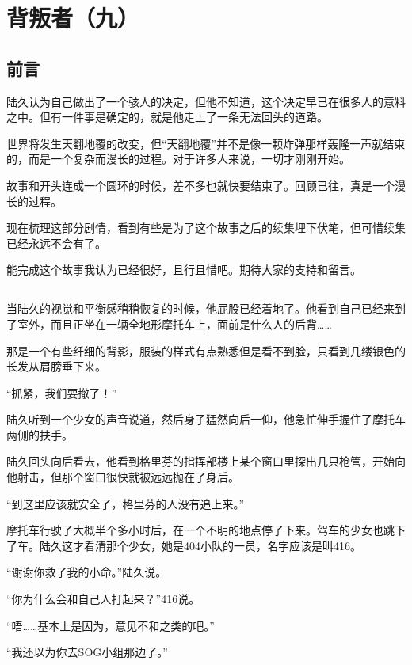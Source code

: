 \chapter{背叛者（九）}

\section*{前言}


陆久认为自己做出了一个骇人的决定，但他不知道，这个决定早已在很多人的意料之中。但有一件事是确定的，就是他走上了一条无法回头的道路。

世界将发生天翻地覆的改变，但“天翻地覆”并不是像一颗炸弹那样轰隆一声就结束的，而是一个复杂而漫长的过程。对于许多人来说，一切才刚刚开始。

\lineseparator

故事和开头连成一个圆环的时候，差不多也就快要结束了。回顾已往，真是一个漫长的过程。

现在梳理这部分剧情，看到有些是为了这个故事之后的续集埋下伏笔，但可惜续集已经永远不会有了。

能完成这个故事我认为已经很好，且行且惜吧。期待大家的支持和留言。

\section*{}

当陆久的视觉和平衡感稍稍恢复的时候，他屁股已经着地了。他看到自己已经来到了室外，而且正坐在一辆全地形摩托车上，面前是什么人的后背……

那是一个有些纤细的背影，服装的样式有点熟悉但是看不到脸，只看到几缕银色的长发从肩膀垂下来。

“抓紧，我们要撤了！”

陆久听到一个少女的声音说道，然后身子猛然向后一仰，他急忙伸手握住了摩托车两侧的扶手。

陆久回头向后看去，他看到格里芬的指挥部楼上某个窗口里探出几只枪管，开始向他射击，但那个窗口很快就被远远抛在了身后。

“到这里应该就安全了，格里芬的人没有追上来。”

摩托车行驶了大概半个多小时后，在一个不明的地点停了下来。驾车的少女也跳下了车。陆久这才看清那个少女，她是404小队的一员，名字应该是叫416。

“谢谢你救了我的小命。”陆久说。

“你为什么会和自己人打起来？”416说。

“唔……基本上是因为，意见不和之类的吧。”

“我还以为你去SOG小组那边了。”

